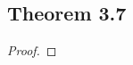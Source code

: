 \documentclass[../../main.tex]{subfiles}
\begin{document}
\subsection{Theorem 3.7}
\begin{wts}

\end{wts}
\begin{proof}

\end{proof}
\end{document}
